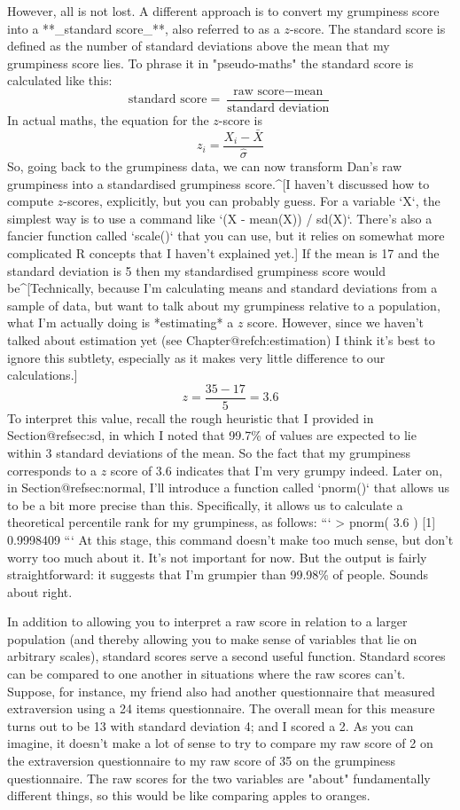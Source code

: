 However, all is not lost. A different approach is to convert my grumpiness score into a **_standard score_**, also referred to as a $z$-score. The standard score is defined as the number of standard deviations above the mean that my grumpiness score lies. To phrase it in "pseudo-maths" the standard score is calculated like this:
$$
\mbox{standard score} = \frac{\mbox{raw score} - \mbox{mean}}{\mbox{standard deviation}}
$$ 
In actual maths, the equation for the $z$-score is
$$
z_i = \frac{X_i - \bar{X}}{\hat\sigma}
$$
So, going back to the grumpiness data, we can now transform Dan's raw grumpiness into a standardised grumpiness score.^[I haven't discussed how to compute $z$-scores, explicitly, but you can probably guess. For a variable `X`, the simplest way is to use a command like `(X - mean(X)) / sd(X)`. There's also a fancier function called `scale()` that you can use, but it relies on somewhat more complicated R concepts that I haven't explained yet.] If the mean is 17 and the standard deviation is 5 then my standardised grumpiness score would be^[Technically, because I'm calculating means and standard deviations from a sample of data, but want to talk about my grumpiness relative to a population, what I'm actually doing is *estimating* a $z$ score. However, since we haven't talked about estimation yet (see Chapter@refch:estimation) I think it's best to ignore this subtlety, especially as it makes very little difference to our calculations.] 
$$
z = \frac{35 - 17}{5} = 3.6
$$
To interpret this value, recall the rough heuristic that I provided in Section@refsec:sd, in which I noted that 99.7\% of values are expected to lie within 3 standard deviations of the mean. So the fact that my grumpiness corresponds to a $z$ score of 3.6 indicates that I'm very grumpy indeed. Later on, in Section@refsec:normal, I'll introduce a function called `pnorm()` that allows us to be a bit more precise than this. Specifically, it allows us to calculate a theoretical percentile rank for my grumpiness, as follows: 
```
> pnorm( 3.6 )
[1] 0.9998409
```
At this stage, this command doesn't make too much sense, but don't worry too much about it. It's not important for now. But the output is fairly straightforward: it suggests that I'm grumpier than 99.98\% of people. Sounds about right. 


In addition to allowing you to interpret a raw score in relation to a larger population (and thereby allowing you to make sense of variables that lie on arbitrary scales), standard scores serve a second useful function. Standard scores can be compared to one another in situations where the raw scores can't. Suppose, for instance, my friend also had another questionnaire that measured extraversion using a 24 items questionnaire. The overall mean for this measure turns out to be 13 with standard deviation 4; and I scored a 2. As you can imagine, it doesn't make a lot of sense to try to compare my raw score of 2 on the extraversion questionnaire to my raw score of 35 on the grumpiness questionnaire. The raw scores for the two variables are "about" fundamentally different things, so this would be like comparing apples to oranges.

